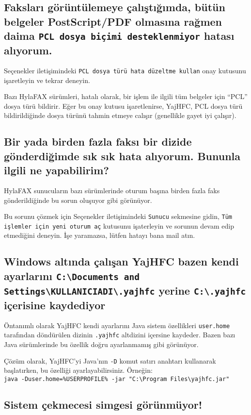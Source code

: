 \documentclass[a4paper,10pt]{scrartcl}
\begin{document}
\subsection{Faksları görüntülemeye çalıştığımda, bütün belgeler PostScript/PDF olmasına rağmen daima 
   \texttt{PCL dosya biçimi desteklenmiyor} hatası alıyorum.}

Seçenekler iletişimindeki \texttt{PCL dosya türü hata düzeltme kullan} onay kutusunu işaretleyin ve tekrar deneyin.

Bazı HylaFAX sürümleri, hatalı olarak, bir işlem ile ilgili tüm belgeler için
``PCL'' dosya türü bildirir. Eğer bu onay kutusu işaretlenirse, YajHFC, 
PCL dosya türü bildirildiğinde dosya türünü tahmin etmeye calışır (genellikle gayet iyi çalışır). 


\subsection{Bir yada birden fazla faksı bir dizide gönderdiğimde sık sık hata alıyorum. Bununla ilgili ne yapabilirim?}

HylaFAX sunucuların bazı sürümlerinde oturum başına birden fazla faks gönderildiğinde bu sorun oluşuyor gibi görünüyor.

Bu sorunu çözmek için Seçenekler iletişimindeki \texttt{Sunucu} sekmesine gidin, \texttt{Tüm işlemler için yeni oturum aç} kutusunu işaterleyin ve sorunun devam edip etmediğini deneyin.
İşe yaramazsa, lütfen hatayı bana mail atın.

\subsection{Windows altında çalışan YajHFC bazen kendi ayarlarını \texttt{C:\textbackslash Documents and Settings\textbackslash KULLANICIADI\textbackslash .yajhfc} yerine \texttt{C:\textbackslash .yajhfc} içerisine kaydediyor}

Öntanımlı olarak YajHFC kendi ayarlarını Java sistem özellikleri \texttt{user.home} tarafından döndürülen dizinin 
\texttt{.yajhfc} altdizini içersine kaydeder.
Bazen bazı Java sürümlerinde bu özellik doğru ayarlanmamış gibi görünüyor.

Çözüm olarak, YajHFC'yi Java'nın \texttt{-D} komut satırı anahtarı kullanarak başlatırken, bu özelliği ayarlayabilirsiniz. Örneğin: \\
\texttt{java -Duser.home=\%USERPROFILE\% -jar "C:\textbackslash Program Files\textbackslash yajhfc.jar"}

\subsection{Sistem çekmecesi simgesi görünmüyor!}
\end{document}

